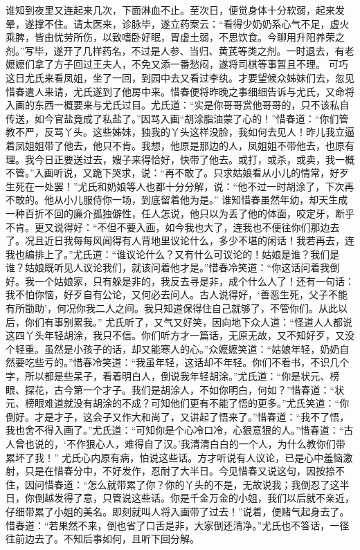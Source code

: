 \documentclass[12pt,oneside]{book}
\begin{document}
谁知到夜里又连起来几次，下面淋血不止。至次日，便觉身体十分软弱，起来发晕，遂撑不住。请太医来，诊脉毕，遂立药案云：“看得少奶奶系心气不足，虚火乘脾，皆由忧劳所伤，以致嗜卧好眠，胃虚土弱，不思饮食。今聊用升阳养荣之剂。”写毕，遂开了几样药名，不过是人参、当归、黄芪等类之剂。一时退去，有老嬷嬷们拿了方子回过王夫人，不免又添一番愁闷，遂将司棋等事暂且不理。
可巧这日尤氏来看凤姐，坐了一回，到园中去又看过李纨。才要望候众姊妹们去，忽见惜春遣人来请，尤氏遂到了他房中来。惜春便将昨晚之事细细告诉与尤氏，又命将入画的东西一概要来与尤氏过目。尤氏道：“实是你哥哥赏他哥哥的，只不该私自传送，如今官盐竟成了私盐了。”因骂入画“胡涂脂油蒙了心的！”惜春道：“你们管教不严，反骂丫头。这些姊妹，独我的丫头这样没脸，我如何去见人！昨儿我立逼着凤姐姐带了他去，他只不肯。我想，他原是那边的人，凤姐姐不带他去，也原有理。我今日正要送过去，嫂子来得恰好，快带了他去。或打，或杀，或卖，我一概不管。”入画听说，又跪下哭求，说：“再不敢了。只求姑娘看从小儿的情常，好歹生死在一处罢！”尤氏和奶娘等人也都十分分解，说：“他不过一时胡涂了，下次再不敢的。他从小儿服侍你一场，到底留着他为是。”
谁知惜春虽然年幼，却天生成一种百折不回的廉介孤独僻性，任人怎说，他只以为丢了他的体面，咬定牙，断乎不肯。更又说得好：“不但不要入画，如今我也大了，连我也不便往你们那边去了。况且近日我每每风闻得有人背地里议论什么，多少不堪的闲话！我若再去，连我也编排上了。”尤氏道：“谁议论什么？又有什么可议论的！姑娘是谁？我们是谁？姑娘既听见人议论我们，就该问着他才是。”惜春冷笑道：“你这话问着我倒好。我一个姑娘家，只有躲是非的，我反去寻是非，成个什么人了！还有一句话：我不怕你恼，好歹自有公论，又何必去问人。古人说得好，‘善恶生死，父子不能有所勖助’，何况你我二人之间。我只知道保得住自己就够了，不管你们。从此以后，你们有事别累我。”
尤氏听了，又气又好笑，因向地下众人道：“怪道人人都说这四丫头年轻胡涂，我只不信。你们听方才一篇话，无原无故，又不知好歹，又没个轻重。虽然是小孩子的话，却又能寒人的心。”众嬷嬷笑道：“姑娘年轻，奶奶自然要吃些亏的。”惜春冷笑道：“我虽年轻，这话却不年轻。你们不看书，不识几个字，所以都是些呆子，看着明白人，倒说我年轻胡涂。”尤氏道：“你是状元、榜眼、探花，古今第一个才子。我们是胡涂人，不如你明白，何如？”惜春道：“状元、榜眼难道就没有胡涂的不成？可知他们更有不能了悟的更多。”尤氏笑道：“你倒好。才是才子，这会子又作大和尚了，又讲起了悟来了。”惜春道：“我不了悟，我也舍不得入画了。”尤氏道：“可知你是个心冷口冷，心狠意狠的人。”惜春道：“古人曾也说的，‘不作狠心人，难得自了汉。’我清清白白的一个人，为什么教你们带累坏了我！”
尤氏心内原有病，怕说这些话。方才听说有人议论，已是心中羞恼激射，只是在惜春分中，不好发作，忍耐了大半日。今见惜春又说这句，因按捺不住，因问惜春道：“怎么就带累了你？你的丫头的不是，无故说我；我倒忍了这半日，你倒越发得了意，只管说这些话。你是千金万金的小姐，我们以后就不亲近，仔细带累了小姐的美名。即刻就叫人将入画带了过去！”说着，便赌气起身去了。惜春道：“若果然不来，倒也省了口舌是非，大家倒还清净。”尤氏也不答话，一径往前边去了。不知后事如何，且听下回分解。
\end{document}
